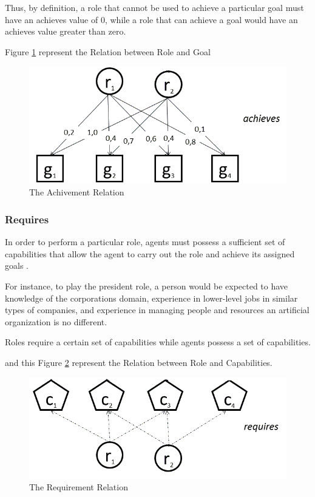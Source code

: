 Thus, by definition, a role that cannot be used to achieve a particular goal must have an achieves value of 0, while a role that can achieve a goal would have an achieves value greater than zero\cite{omacs4}.

Figure \ref{fig:The Achivement Relation} represent the Relation between Role and Goal  
\begin{figure}[th]
	\centering
		\includegraphics[scale=0.5]{ch1/img/RelAchieve}
	\caption{\label{fig:The Achivement Relation}The Achivement Relation}
\end{figure} 
 

\subsubsection{Requires}

In order to perform a particular role, agents must possess a sufficient set of capabilities that allow
the agent to carry out the role and achieve its assigned goals \cite{omacs2}.

For instance, to play the  president role,
 a person would be expected to have knowledge of the corporations domain, experience in
lower-level jobs in similar types of companies, and experience in managing people and resources 
an artificial organization is no different. 

Roles require a certain set of capabilities while agents
possess a set of capabilities\cite{omacs2}.


and this Figure \ref{fig:The Requirment Relation} represent the Relation between Role and Capabilities.

\begin{figure}[th]
	\centering
		\includegraphics[scale=0.5]{ch1/img/RelRequire}
	\caption{\label{fig:The Requirment Relation}The Requirement Relation}
\end{figure}

